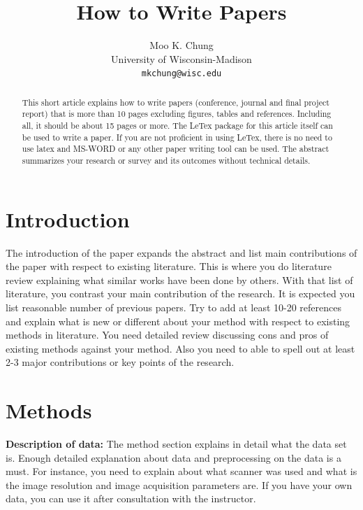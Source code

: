 \documentclass[12pt,portrait]{article}
\begin{document}

\title{How to Write Papers
}
\author{Moo K. Chung\\
University of Wisconsin-Madison\\
\quad \tt{mkchung@wisc.edu}}
\maketitle 

\begin{abstract}
This short article explains how to write papers (conference, journal and final project report) that is more than 10 pages excluding figures, tables and references. Including all, it should be about 15 pages or more. The LeTex package for this article itself can be used to write a paper.  If you are not proficient in using LeTex, there is no need to use latex and MS-WORD or any other paper writing tool can be used. The abstract summarizes your research or survey and its outcomes without technical details. 
\end{abstract}

\section{Introduction}


The introduction of the paper expands the abstract and list main contributions of the paper with respect to existing literature. This is where you do literature review explaining what similar works have been done by others. With that list of literature, you contrast your main contribution of the research. It is expected you list reasonable number of previous papers. Try to add at least 10-20 references and explain what is new or different about your method with respect to existing methods in literature. You need detailed review discussing cons and pros of existing methods against your method. Also you need to able to spell out at least 2-3 major contributions or key points of the research.



\section{Methods}

{\bf Description of data:} The method section explains in detail what the data set is. Enough detailed explanation about data and preprocessing on the data is a must. For instance, you need to explain about what scanner was used and what is the image resolution and image acquisition parameters are. If you have your own data, you can use it after consultation with the instructor.\\
\end{document}
